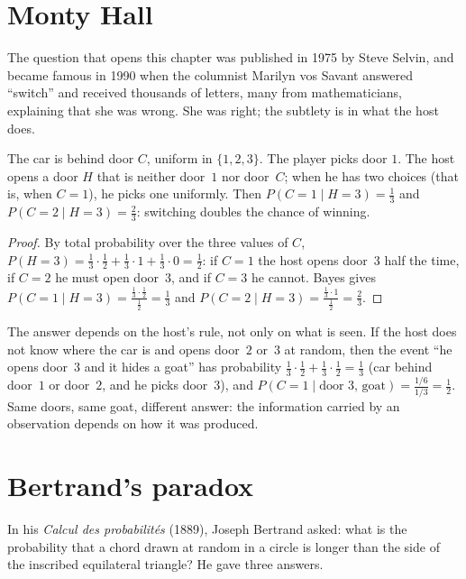 \section{Monty Hall}

The question that opens this chapter was published in 1975 by Steve Selvin, and became famous in 1990 when the
columnist Marilyn vos Savant answered ``switch'' and received thousands of letters, many from mathematicians,
explaining that she was wrong. She was right; the subtlety is in what the host does.

\begin{proposition}\label{prop:monty}
The car is behind door $C$, uniform in $\{1,2,3\}$. The player picks door $1$. The host opens a door $H$ that is
neither door~$1$ nor door~$C$; when he has two choices (that is, when $C=1$), he picks one uniformly. Then
$P(C=1\mid H=3)=\frac13$ and $P(C=2\mid H=3)=\frac23$: switching doubles the chance of winning.
\end{proposition}
\begin{proof}
By total probability over the three values of $C$, $P(H=3)=\frac13\cdot\frac12+\frac13\cdot1+\frac13\cdot0=\frac12$: if
$C=1$ the host opens door~$3$ half the time, if $C=2$ he must open door~$3$, and if $C=3$ he cannot. Bayes gives
$P(C=1\mid H=3)=\frac{\frac13\cdot\frac12}{\frac12}=\frac13$ and $P(C=2\mid H=3)=\frac{\frac13\cdot1}{\frac12}=\frac23$.
\end{proof}

The answer depends on the host's rule, not only on what is seen. If the host does not know where the car is and
opens door~$2$ or~$3$ at random, then the event ``he opens door~$3$ and it hides a goat'' has probability
$\frac13\cdot\frac12+\frac13\cdot\frac12=\frac13$ (car behind door~$1$ or door~$2$, and he picks door~$3$), and
$P(C=1\mid\text{door 3, goat})=\frac{1/6}{1/3}=\frac12$. Same doors, same goat, different answer: the
information carried by an observation depends on how it was produced.

\section{Bertrand's paradox}

In his \emph{Calcul des probabilités} (1889), Joseph Bertrand asked: what is the probability that a chord drawn
at random in a circle is longer than the side of the inscribed equilateral triangle? He gave three answers.

